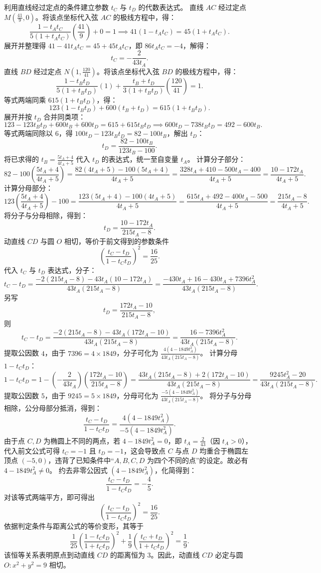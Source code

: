 \begin{solution}
利用直线经过定点的条件建立参数 $t_C$ 与 $t_D$ 的代数表达式。
直线 $AC$ 经过定点 $M\left(\frac{41}{9}, 0\right)$。将该点坐标代入弦 $AC$ 的极线方程中，得：
\[ \frac{1-t_A t_C}{5(1+t_A t_C)} \left(\frac{41}{9}\right) + 0 = 1 \implies 41(1 - t_A t_C) = 45(1 + t_A t_C). \]
展开并整理得 $41 - 41t_A t_C = 45 + 45t_A t_C$，即 $86t_A t_C = -4$，解得：
\[ t_C = -\frac{2}{43t_A}. \]
直线 $BD$ 经过定点 $N\left(1, \frac{120}{41}\right)$。将该点坐标代入弦 $BD$ 的极线方程中，得：
\[ \frac{1-t_B t_D}{5(1+t_B t_D)} (1) + \frac{t_B+t_D}{3(1+t_B t_D)} \left(\frac{120}{41}\right) = 1. \]
等式两端同乘 $615(1+t_B t_D)$，得：
\[ 123(1 - t_B t_D) + 600(t_B + t_D) = 615(1 + t_B t_D). \]
展开并按 $t_D$ 合并同类项：
\[ 123 - 123t_B t_D + 600t_B + 600t_D = 615 + 615t_B t_D \implies 600t_D - 738t_B t_D = 492 - 600t_B. \]
等式两端同除以 $6$，得 $100t_D - 123t_B t_D = 82 - 100t_B$，解出 $t_D$：
\[ t_D = \frac{82 - 100t_B}{123t_B - 100}. \]
将已求得的 $t_B = \frac{5t_A + 4}{4t_A + 5}$ 代入 $t_D$ 的表达式，统一至自变量 $t_A$。
计算分子部分：
\[ 82 - 100\left(\frac{5t_A + 4}{4t_A + 5}\right) = \frac{82(4t_A + 5) - 100(5t_A + 4)}{4t_A + 5} = \frac{328t_A + 410 - 500t_A - 400}{4t_A + 5} = \frac{10 - 172t_A}{4t_A + 5}. \]
计算分母部分：
\[ 123\left(\frac{5t_A + 4}{4t_A + 5}\right) - 100 = \frac{123(5t_A + 4) - 100(4t_A + 5)}{4t_A + 5} = \frac{615t_A + 492 - 400t_A - 500}{4t_A + 5} = \frac{215t_A - 8}{4t_A + 5}. \]
将分子与分母相除，得到：
\[ t_D = \frac{10 - 172t_A}{215t_A - 8}. \]
动直线 $CD$ 与圆 $O$ 相切，等价于前文得到的参数条件
\[
\left(\frac{t_C - t_D}{1 - t_C t_D}\right)^2 = \frac{16}{25}.
\]
代入 $t_C$ 与 $t_D$ 表达式，分子：
\[ t_C - t_D = \frac{-2(215t_A - 8) - 43t_A(10 - 172t_A)}{43t_A(215t_A - 8)} = \frac{-430t_A + 16 - 430t_A + 7396t_A^2}{43t_A(215t_A - 8)}. \]
另写
$$t_D = \frac{172t_A - 10}{215t_A - 8},$$
则
$$t_C - t_D = \frac{-2(215t_A - 8) - 43t_A(172t_A - 10)}{43t_A(215t_A - 8)} = \frac{16 - 7396t_A^2}{43t_A(215t_A - 8)}.$$
提取公因数 $4$，由于 $7396 = 4 \times 1849$，分子可化为 $\frac{4(4 - 1849t_A^2)}{43t_A(215t_A - 8)}$。
计算分母 $1 - t_C t_D$：
\[ 1 - t_C t_D = 1 - \left(-\frac{2}{43t_A}\right)\left(\frac{172t_A - 10}{215t_A - 8}\right) = \frac{43t_A(215t_A - 8) + 2(172t_A - 10)}{43t_A(215t_A - 8)} = \frac{9245t_A^2 - 20}{43t_A(215t_A - 8)}. \]
提取公因数 $5$，由于 $9245 = 5 \times 1849$，分母可化为 $\frac{-5(4 - 1849t_A^2)}{43t_A(215t_A - 8)}$。
将分子与分母相除，公分母部分抵消，得到：
\[ \frac{t_C - t_D}{1 - t_C t_D} = \frac{4(4 - 1849t_A^2)}{-5(4 - 1849t_A^2)}. \]
由于点 $C, D$ 为椭圆上不同的两点，若 $4 - 1849t_A^2 = 0$，即 $t_A = \frac{2}{43}$（因 $t_A > 0$），代入前文公式可得 $t_C = -1$ 且 $t_D = -1$，这会导致点 $C$ 与点 $D$ 均重合于椭圆左顶点 $(-5,0)$，违背了已知条件中“$A, B, C, D$ 为四个不同的点”的设定。故必有 $4 - 1849t_A^2 \neq 0$。
约去非零公因式 $(4 - 1849t_A^2)$，化简得到：
\[ \frac{t_C - t_D}{1 - t_C t_D} = -\frac{4}{5}. \]
对该等式两端平方，即可得出
\[ \left(\frac{t_C - t_D}{1 - t_C t_D}\right)^2 = \frac{16}{25}. \]
依据判定条件与距离公式的等价变形，其等于
\[ \frac{1}{25}\left(\frac{1-t_C t_D}{1+t_C t_D}\right)^2 + \frac{1}{9}\left(\frac{t_C+t_D}{1+t_C t_D}\right)^2 = \frac{1}{9}. \]
该恒等关系表明原点到动直线 $CD$ 的距离恒为 $3$。因此，动直线 $CD$ 必定与圆 $O: x^2 + y^2 = 9$ 相切。
\end{solution}

